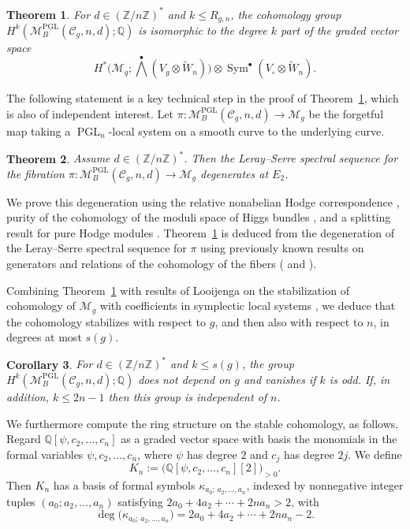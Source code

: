 \documentclass[11pt,reqno]{amsart}
\theoremstyle{plain} %
\newtheorem{theorem}{Theorem}[section]
\newtheorem{corollary}[theorem]{Corollary}
\theoremstyle{definition}
\newcommand{\QQ}{\mathbb{Q}}
\newcommand{\M}{\mathcal{M}}
\newcommand{\C}{\mathcal{C}}
\newcommand{\ZZ}{\mathbb{Z}}
\DeclareMathOperator{\PGL}{PGL}
\DeclareMathOperator{\Sym}{Sym}
\newcommand{\tW}{\widetilde{W}}
\begin{document}
\begin{theorem} \label{thm:mainPGL}
For $d \in (\ZZ/n\ZZ)^*$ and  $k\le R_{g,n}$, the cohomology group $H^k(\M_B^{\PGL}(\C_g, n,d); \QQ)$ is isomorphic to the degree $k$ part of the graded vector space
\begin{equation}\label{eq: PGLresult}
H^*\big(\M_g; \textstyle \bigwedge^\bullet (V_g \otimes \tW_n)\big) \otimes \Sym^\bullet (V_\circ \otimes \tW_n).
\end{equation}
\end{theorem}

The following statement is a key technical step in the proof of Theorem~\ref{thm:mainPGL}, which is also of independent interest. Let $\pi \colon \M_B^{\PGL}(\C_{g},n,d) \to \M_g$ be the forgetful map taking a $\PGL_n$-local system on a smooth curve to the underlying curve.

\begin{theorem} \label{thm:E2PGL}
    Assume $d \in (\ZZ/n\ZZ)^*$. Then the Leray--Serre spectral sequence for the fibration $\pi \colon \M_B^{\PGL}(\C_{g},n,d) \to \M_g$ degenerates at $E_2$.
\end{theorem}

\noindent We prove this degeneration using the relative nonabelian Hodge correspondence \cite{Simpson-reps2}, purity of the cohomology of the moduli space of Higgs bundles \cite[Corollary~1.3.2]{Semiprojective}, and a splitting result for pure Hodge modules \cite[(4.5.4)]{Saito}. Theorem~\ref{thm:mainPGL} is deduced from the degeneration of the Leray--Serre spectral sequence for $\pi$ using previously known results on generators and relations of the cohomology of the fibers (\cite[Theorem~7]{Markman} and \cite[Lemma 4.1.12]{Hausel-RV}). %


Combining Theorem~\ref{thm:mainPGL} with results of Looijenga on the stabilization of cohomology of $\M_g$ with coefficients in symplectic local systems \cite{looijenga-symplectic-coeffs}, we deduce that the cohomology stabilizes with respect to $g$, and then also with respect to $n$, in degrees at most $s(g)$.

\begin{corollary} \label{cor:stab-PGL}
For $d \in (\ZZ/n\ZZ)^*$ and $k \leq s(g)$, the group $H^k(\M_B^{\PGL}(\C_g, n,d); \QQ)$ does not depend on $g$ and vanishes if $k$ is odd.  If, in addition, $k \le 2n-1$ then this group is independent of $n$. 
\end{corollary}

We furthermore compute the ring structure on the stable cohomology, as follows.   Regard $\QQ[\psi,c_2,\ldots,c_n]$ as a graded vector space with basis the monomials in the formal variables $\psi,c_2,\ldots,c_n$, where $\psi$ has degree $2$ and $c_j$ has degree $2j$. We define
\begin{equation}\label{eq:Kn}
K_n:=\big(\QQ[\psi,c_2,\ldots,c_n][2]\big)_{>0}.
\end{equation}
Then $K_n$ has a basis of formal symbols $\kappa_{a_0;\,a_2,\ldots,a_n}$,
indexed by nonnegative integer tuples $(a_0; a_2,\ldots,a_n)$ satisfying $2a_0+4a_2+\cdots+2na_n>2$, with
\[
\deg\big(\kappa_{a_0;\,a_2,\ldots,a_n}\big)=2a_0+4a_2+\cdots+2na_n-2.
\]
\end{document}
